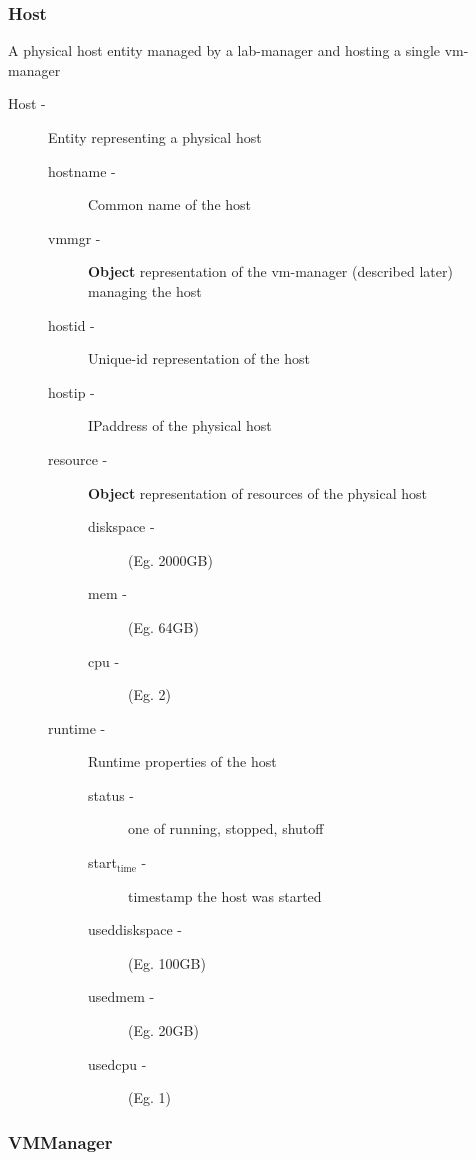 \documentclass[11pt]{article}
\begin{document}
\subsubsection{Host}
\label{sec-1.3.4}


     A physical host entity managed by a lab-manager and hosting a single vm-manager
\begin{description}
\item [Host -] Entity representing a physical host

\begin{description}
\item [hostname -] Common name of the host
\item [vmmgr -] \textbf{Object} representation of the vm-manager
                         (described later) managing the host
\item [hostid -] Unique-id representation of the host
\item [hostip -] IPaddress of the physical host
\item [resource -]  \textbf{Object} representation of resources of the physical host

\begin{description}
\item [diskspace -] (Eg. 2000GB)
\item [mem -] (Eg. 64GB)
\item [cpu -] (Eg. 2)
\end{description}

\item [runtime -] Runtime properties of the host

\begin{description}
\item [status -] one of running, stopped, shutoff
\item [start$_{\mathrm{time}}$ -] timestamp the host was started
\item [useddiskspace -] (Eg. 100GB)
\item [usedmem -] (Eg. 20GB)
\item [usedcpu -] (Eg. 1)
\end{description}

\end{description}

\end{description}
\subsubsection{VMManager}
\label{sec-1.3.5}
\end{document}

